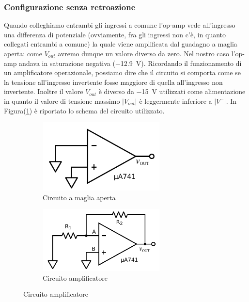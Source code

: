 \subsubsection{Configurazione senza retroazione}

Quando colleghiamo entrambi gli ingressi a comune l'op-amp vede all'ingresso una differenza di potenziale (ovviamente, fra gli ingressi non c'è, in quanto collegati entrambi a comune) la quale viene amplificata dal guadagno a maglia aperta: come $V_{out}$ avremo dunque un valore diverso da zero. Nel nostro caso l'op-amp andava in saturazione negativa (\SI{-12.9}{\volt}). Ricordando il funzionamento di un amplificatore operazionale, possiamo dire che il circuito si comporta come se la tensione all'ingresso invertente fosse maggiore di quella all'ingresso non invertente. Inoltre il valore $V_{out}$ è diverso da \SI{-15}{\volt} utilizzati come alimentazione in quanto il valore di tensione massimo $|V_{out}|$ è leggermente inferiore a $|V^-|$. In Figura(\ref{cir:open_loop}) è riportato lo schema del circuito utilizzato.

\begin{figure}[ht]
        \centering
        \begin{subfigure}[b]{0.35\textwidth}
                 \includegraphics[width=0.70\textwidth]{../E02/latex/open_loop.pdf}
                \caption{Circuito a maglia aperta}
                \label{cir:open_loop}
        \end{subfigure}%
    \quad
        \begin{subfigure}[b]{0.35\textwidth}
               \includegraphics[width=0.70\textwidth]{../E02/latex/inv.pdf}
                \caption{Circuito amplificatore}
                \label{cir:inv}
        \end{subfigure}
     
\end{figure}


